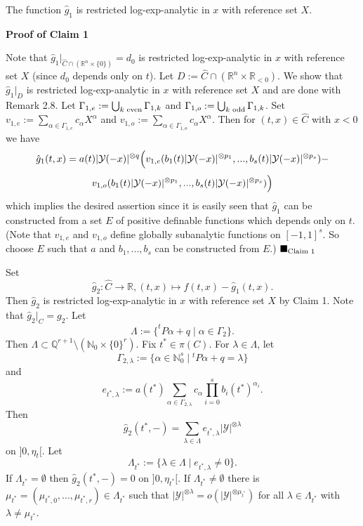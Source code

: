 \documentclass[12pt]{article}
\def\vs{\vspace}
\def\IN{\mathbb N}
\def\IQ{\mathbb Q}
\def\ma{\mathcal}
\begin{document}
\vs{0.1cm}
The function $\hat{g}_1$ is restricted log-exp-analytic in $x$ with reference set $X$.

\vs{0.3cm}
{\bf Proof of Claim 1} 

\vs{0.1cm}
Note that $\hat{g}_1|_{\hat{C} \cap (\mathbb{R}^n \times \{0\})}=d_0$ is restricted log-exp-analytic in $x$ with reference set $X$ (since $d_0$ depends only on $t$). Let $D:=\hat{C} \cap (\mathbb{R}^n \times \mathbb{R}_{<0})$. We show that $\hat{g}_1|_D$ is restricted log-exp-analytic in $x$ with reference set $X$ and are done with Remark 2.8. Let $\Gamma_{1,e}:= \bigcup_{k \textnormal{ even}} \Gamma_{1,k}$ and $\Gamma_{1,o}:= \bigcup_{k \textnormal{ odd}} \Gamma_{1,k}$. Set $v_{1,e}:=\sum_{\alpha \in \Gamma_{1,e}}c_{\alpha}X^{\alpha}$ and $v_{1,o}:=\sum_{\alpha \in \Gamma_{1,o}}c_{\alpha}X^{\alpha}$. Then for $(t,x) \in \hat{C}$ with $x<0$ we have
$$\hat{g}_1(t,x)=a(t)\vert{\mathcal{Y}(-x)}\vert^{\otimes q} \Bigl(v_{1,e}(b_1(t)\vert{\mathcal{Y}(-x)}\vert^{\otimes p_1},...,b_s(t)\vert{\mathcal{Y}(-x)}\vert^{\otimes p_s})-$$
$$v_{1,o}(b_1(t)\vert{\mathcal{Y}(-x)}\vert^{\otimes p_1},...,b_s(t)\vert{\mathcal{Y}(-x)}\vert^{\otimes p_s}) \Bigl)$$  
which implies the desired assertion since it is easily seen that $\hat{g}_1$ can be constructed from a set $E$ of positive definable functions which depends only on $t$. (Note that $v_{1,e}$ and $v_{1,o}$ define globally subanalytic functions on $[-1,1]^s$. So choose $E$ such that $a$ and $b_1,...,b_s$ can be constructed from $E$.) \hfill$\blacksquare_{\textnormal{Claim }1}$

\vs{0.4cm}
Set
$$\hat{g}_2:\hat{C} \to \mathbb{R}, (t,x) \mapsto f(t,x) - \hat{g}_1(t,x).$$
Then $\hat{g}_2$ is restricted log-exp-analytic in $x$ with reference set $X$ by Claim 1. Note that $\hat{g}_2|_C=g_2$. Let $$\Lambda:=\big\{^tP\alpha+q\;\big\vert\;\alpha\in \Gamma_2 \big\}.$$
Then $\Lambda \subset \IQ^{r+1}\setminus (\IN_0\times \{0\}^r)$. Fix $t^* \in \pi(C)$. For $\lambda \in \Lambda$, let
$$\Gamma_{2,\lambda}:=\big\{\alpha\in \IN_0^s\;\big\vert\;^tP\alpha+q=\lambda\big\}$$
and 
$$e_{t^*,\lambda}:=a(t^*)\sum_{\alpha\in \Gamma_{2,\lambda}}c_\alpha\prod_{i=0}^sb_i(t^*)^{\alpha_i}.$$
Then 
$$\hat{g}_2(t^*,-)=\sum_{\lambda\in \Lambda}e_{t^*,\lambda}|\ma{Y}|^{\otimes \lambda}$$
on $]0,\eta_t[$. Let 
$$\Lambda_{t^*}:=\{\lambda \in \Lambda \mid e_{t^*,\lambda} \neq 0\}.$$
If $\Lambda_{t^*} = \emptyset$ then $\hat{g}_2(t^*,-)=0$ on $]0,\eta_{t^*}[$. If $\Lambda_{t^*} \neq \emptyset$ there is $\mu_{t^*} = (\mu_{t^*,0},...,\mu_{t^*,r}) \in \Lambda_{t^*}$ such that
$|\ma{Y}|^{\otimes \lambda}=o(|\ma{Y}|^{\otimes \mu_{t^*}})$ for all $\lambda\in \Lambda_{t^*}$ with $\lambda \neq \mu_{t^*}$.
\end{document}
